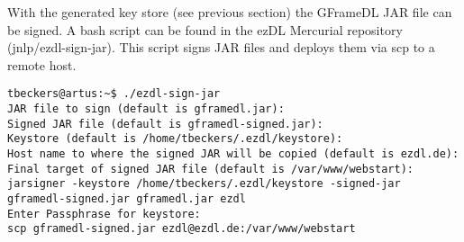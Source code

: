 \documentclass[12pt]{book}
\begin{document}
With the generated key store (see previous section) the GFrameDL JAR file can be signed. A bash script can be found in the ezDL Mercurial repository (jnlp/ezdl-sign-jar). This script signs JAR files and deploys them via scp to a remote host.

\begin{verbatim}
tbeckers@artus:~$ ./ezdl-sign-jar 
JAR file to sign (default is gframedl.jar): 
Signed JAR file (default is gframedl-signed.jar): 
Keystore (default is /home/tbeckers/.ezdl/keystore): 
Host name to where the signed JAR will be copied (default is ezdl.de): 
Final target of signed JAR file (default is /var/www/webstart): 
jarsigner -keystore /home/tbeckers/.ezdl/keystore -signed-jar gframedl-signed.jar gframedl.jar ezdl
Enter Passphrase for keystore: 
scp gframedl-signed.jar ezdl@ezdl.de:/var/www/webstart
\end{verbatim}
\end{document}
